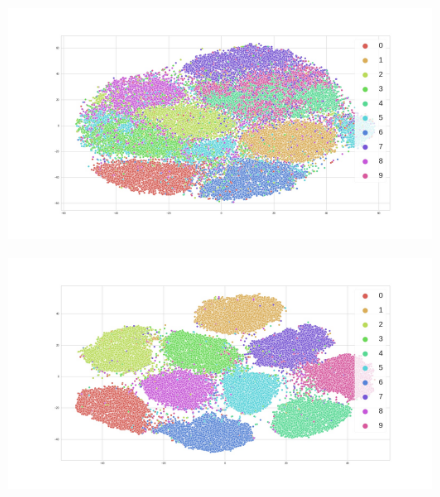 \documentclass[runningheads]{llncs}
\begin{document}
\begin{figure}
\centering
\begin{minipage}{.5\textwidth}
  \centering
  \includegraphics[width=.9\linewidth]{tsne_unsup.jpg}
  \label{tsne_un}
\end{minipage}%
\begin{minipage}{.5\textwidth}
  \centering
  \includegraphics[width=.9\linewidth]{tsne_semi.jpg}
  \label{tsne_semi}
\end{minipage}
\end{figure}
\end{document}
